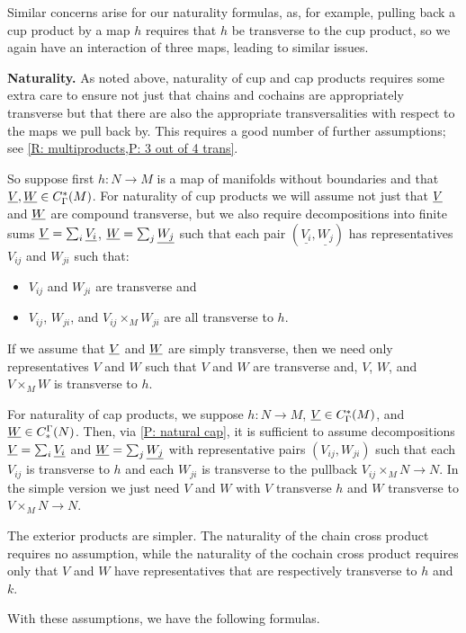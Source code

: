 Similar concerns arise for our naturality formulas, as, for example, pulling back a cup product by a map $h$ requires that $h$ be transverse to the cup product, so we again have an interaction of three maps, leading to similar issues.

\textbf{Naturality.}
As noted above, naturality of cup and cap products requires some extra care to ensure not just that chains and cochains are appropriately transverse but that there are also the appropriate transversalities with respect to the maps we pull back by.
This requires a good number of further assumptions; see \cref{R: multiproducts,P: 3 out of 4 trans}.

So suppose first $h \colon N \to M$ is a map of manifolds without boundaries and that $\underline{V},\underline{W} \in C^*_{\Gamma}(M)$.
For naturality of cup products we will assume not just that $\underline{V}$ and $\underline{W}$ are compound transverse, but we also require decompositions into finite sums $\underline{V} = \sum_i \underline{V_i}$, $\underline{W} = \sum_j \underline{W_j}$ such that each pair $(\underline{V_i},\underline{W_j})$ has representatives $V_{ij}$ and $W_{ji}$ such that:
\begin{itemize}
	\item $V_{ij}$ and $W_{ji}$ are transverse and
	\item $V_{ij}$, $W_{ji}$, and $V_{ij} \times_M W_{ji}$ are all transverse to $h$.
\end{itemize}
If we assume that $\underline{V}$ and $\underline{W}$ are simply transverse, then we need only representatives $V$ and $W$ such that $V$ and $W$ are transverse and, $V$, $W$, and $V \times_M W$ is transverse to $h$.

For naturality of cap products, we suppose $h \colon N \to M$, $\underline{V} \in C^*_\Gamma(M)$, and $\underline{W} \in C_*^\Gamma(N)$.
Then, via \cref{P: natural cap}, it is sufficient to assume decompositions $\underline{V} = \sum_i \underline{V_i}$ and $\underline{W} = \sum_j \underline{W_j}$ with representative pairs $(V_{ij}, W_{ji})$ such that each $V_{ij}$ is transverse to $h$ and each $W_{ji}$ is transverse to the pullback $V_{ij} \times_M N \to N$.
In the simple version we just need $V$ and $W$ with $V$ transverse $h$ and $W$ transverse to $V \times_M N \to N$.

The exterior products are simpler.
The naturality of the chain cross product requires no assumption, while the naturality of the cochain cross product requires only that $V$ and $W$ have representatives that are respectively transverse to $h$ and $k$.

With these assumptions, we have the following formulas.

